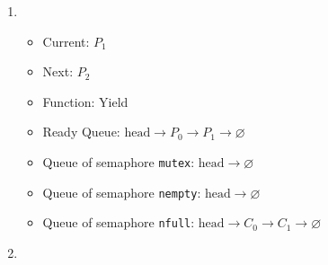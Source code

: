 \documentclass[11pt]{article}
\begin{document}
\begin{question}
\begin{enumerate}
{}
                \item {
                    \begin{itemize}
                        \item{Current: $P_{1}$}
                        \item{Next: $P_{2}$}
                        \item{Function: Yield}
                        \item{
                            Ready Queue: $\text{head}\longrightarrow
                            P_{0}\longrightarrow
                            P_{1}\longrightarrow
                            \varnothing$
                        } \item{
                            Queue of semaphore {\tt mutex}: $\text{head}\longrightarrow
                            \varnothing$
                        }
                        \item{
                            Queue of semaphore {\tt nempty}: $\text{head}\longrightarrow
                            \varnothing$
                        }
                        \item{
                            Queue of semaphore {\tt nfull}: $\text{head}\longrightarrow
                            C_{0}\longrightarrow
                            C_{1}\longrightarrow
                            \varnothing$
                        }
                \end{itemize}}
                \item {
                    }
\end{enumerate}
\end{question}
\end{document}
